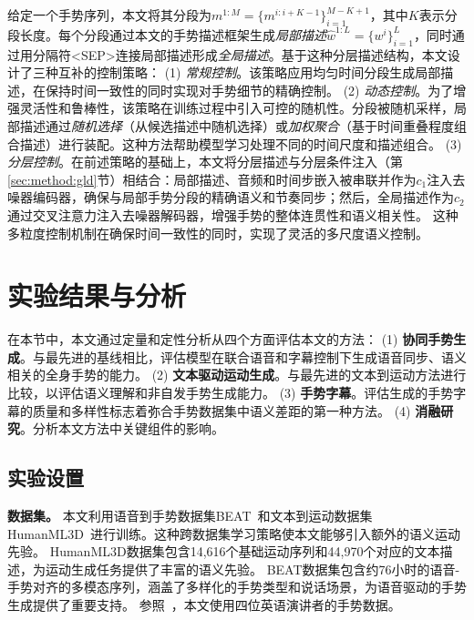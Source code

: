 给定一个手势序列，本文将其分段为$m^{1:M}=\{m^{i:i+K-1}\}_{i=1}^{M-K+1}$，其中$K$表示分段长度。每个分段通过本文的手势描述框架生成\textit{局部描述}$\hat{w}^{1:L}=\{w^i\}^L_{i=1}$，同时通过用分隔符<SEP>连接局部描述形成\textit{全局描述}。基于这种分层描述结构，本文设计了三种互补的控制策略：
(1) \textit{常规控制}。该策略应用均匀时间分段生成局部描述，在保持时间一致性的同时实现对手势细节的精确控制。
(2) \textit{动态控制}。为了增强灵活性和鲁棒性，该策略在训练过程中引入可控的随机性。分段被随机采样，局部描述通过\textit{随机选择}（从候选描述中随机选择）或\textit{加权聚合}（基于时间重叠程度组合描述）进行装配。这种方法帮助模型学习处理不同的时间尺度和描述组合。
(3) \textit{分层控制}。在前述策略的基础上，本文将分层描述与分层条件注入（第\ref{sec:method:gld}节）相结合：局部描述、音频和时间步嵌入被串联并作为$c_1$注入去噪器编码器，确保与局部手势分段的精确语义和节奏同步；然后，全局描述作为$c_2$通过交叉注意力注入去噪器解码器，增强手势的整体连贯性和语义相关性。
这种多粒度控制机制在确保时间一致性的同时，实现了灵活的多尺度语义控制。





\section{实验结果与分析}
\label{sec:experiments}
在本节中，本文通过定量和定性分析从四个方面评估本文的方法：
(1) \textbf{协同手势生成}。与最先进的基线相比，评估模型在联合语音和字幕控制下生成语音同步、语义相关的全身手势的能力。
(2) \textbf{文本驱动运动生成}。与最先进的文本到运动方法进行比较，以评估语义理解和非自发手势生成能力。
(3) \textbf{手势字幕}。评估生成的手势字幕的质量和多样性标志着弥合手势数据集中语义差距的第一种方法。
(4) \textbf{消融研究}。分析本文方法中关键组件的影响。

\subsection{实验设置}
\textbf{数据集。}
本文利用语音到手势数据集BEAT~\cite{liu2022beat}和文本到运动数据集HumanML3D~\cite{guo2022humanml3d}进行训练。这种跨数据集学习策略使本文能够引入额外的语义运动先验。
HumanML3D数据集包含14,616个基础运动序列和44,970个对应的文本描述，为运动生成任务提供了丰富的语义先验。
BEAT数据集包含约76小时的语音-手势对齐的多模态序列，涵盖了多样化的手势类型和说话场景，为语音驱动的手势生成提供了重要支持。
参照~\cite{liu2022beat}，本文使用四位英语演讲者的手势数据。

